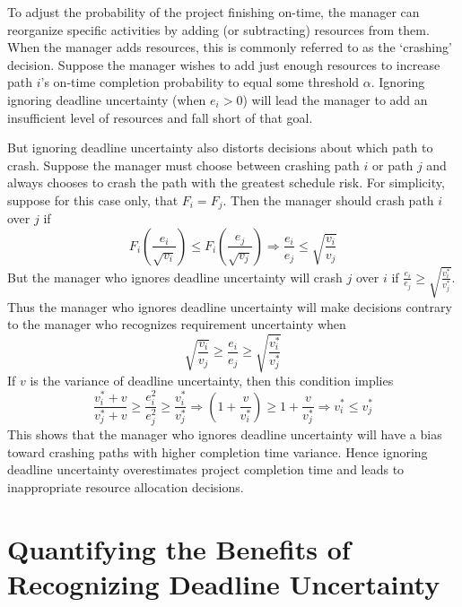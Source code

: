 \documentclass[11pt]{article}
\begin{document}
To adjust the probability of the project finishing on-time, the manager can reorganize specific activities by adding (or subtracting) resources from them.  When the manager adds resources, this is commonly referred to as the `crashing' decision.  Suppose the manager wishes to add just enough resources to increase path $i$'s on-time completion probability to equal some threshold $\alpha$.  Ignoring ignoring deadline uncertainty (when $e_i>0$) will lead the manager to add an insufficient level of resources and fall short of that goal.\par
But ignoring deadline uncertainty also distorts decisions about which path to crash.  Suppose the manager must choose between crashing path $i$ or path $j$ and always chooses to crash the path with the greatest schedule risk. For simplicity, suppose for this case only, that $F_i=F_j$.  
 Then the manager should crash path $i$ over $j$ if $$F_i(\frac{e_i}{\sqrt{v_i}}) \leq F_i(\frac{e_j}{\sqrt{v_j}}) \Longrightarrow \frac{e_i}{e_j} \leq \sqrt{\frac{v_i}{v_j}}$$
But the manager who ignores deadline uncertainty will crash $j$ over $i$ if  $\frac{e_i}{e_j} \geq \sqrt{\frac{v^*_i}{v^*_j}}$.
Thus the manager who ignores deadline uncertainty will make decisions contrary to the manager who recognizes requirement uncertainty when 
$$\sqrt{ \frac{v_i}{v_j}} \geq \frac{e_i}{e_j} \geq \sqrt{\frac{v^*_i}{v^*_j}}$$
If $v$ is the variance of deadline uncertainty, then this condition implies
$$ \frac{v^*_i+v}{v^*_j+v} \geq \frac{e^2_i}{e^2_j} \geq \frac{v^*_i}{v^*_j}   
\Longrightarrow   (1+\frac{v}{v^*_i})  \geq 1 + \frac{v}{v^*_j}  
\Longrightarrow  v^*_i \leq v^*_j $$
This shows that the manager who ignores deadline uncertainty will have a bias toward crashing paths with higher completion time variance. Hence ignoring deadline uncertainty overestimates project completion time and leads to inappropriate resource allocation decisions.
\section{Quantifying the Benefits of Recognizing Deadline Uncertainty}  
\end{document}
